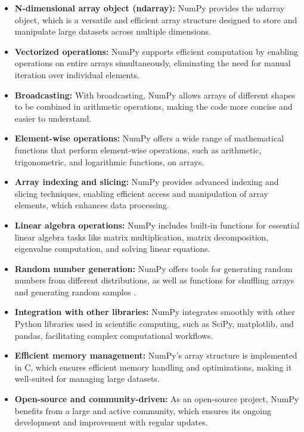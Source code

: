 \begin{itemize}
	\item \textbf{N-dimensional array object (ndarray):} NumPy provides the ndarray object, which is a versatile and efficient array structure designed to store and manipulate large datasets across multiple dimensions.
	\item \textbf{Vectorized operations:} NumPy supports efficient computation by enabling operations on entire arrays simultaneously, eliminating the need for manual iteration over individual elements.
	\item \textbf{Broadcasting:} With broadcasting, NumPy allows arrays of different shapes to be combined in arithmetic operations, making the code more concise and easier to understand.
	\item \textbf{Element-wise operations:} NumPy offers a wide range of mathematical functions that perform element-wise operations, such as arithmetic, trigonometric, and logarithmic functions, on arrays.
	\item \textbf{Array indexing and slicing:} NumPy provides advanced indexing and slicing techniques, enabling efficient access and manipulation of array elements, which enhances data processing.
	\item \textbf{Linear algebra operations:} NumPy includes built-in functions for essential linear algebra tasks like matrix multiplication, matrix decomposition, eigenvalue computation, and solving linear equations.
	\item \textbf{Random number generation:} NumPy offers tools for generating random numbers from different distributions, as well as functions for shuffling arrays and generating random samples \cite{NumPy:2024}.
	\item \textbf{Integration with other libraries:} NumPy integrates smoothly with other Python libraries used in scientific computing, such as SciPy, matplotlib, and pandas, facilitating complex computational workflows.
	\item \textbf{Efficient memory management:} NumPy's array structure is implemented in C, which ensures efficient memory handling and optimizations, making it well-suited for managing large datasets.
	\item \textbf{Open-source and community-driven:} As an open-source project, NumPy benefits from a large and active community, which ensures its ongoing development and improvement with regular updates.
\end{itemize}


